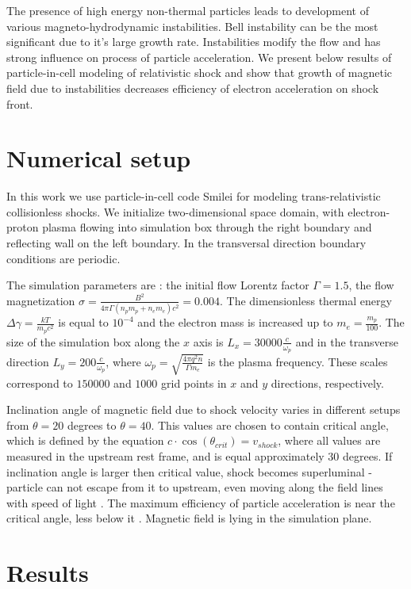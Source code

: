 \documentclass[a4paper]{jpconf}
\begin{document}
	The presence of high energy non-thermal particles leads to development of various magneto-hydrodynamic instabilities. Bell instability \cite{Bell04} can be the most significant due to it's large growth rate. Instabilities modify the flow and has strong influence on process of particle acceleration. We present below results of particle-in-cell modeling of relativistic shock and show that growth of magnetic field due to instabilities decreases efficiency of electron acceleration on shock front.
	
	
	\section{Numerical setup}
	In this work we use particle-in-cell code Smilei \cite{Smilei18} for modeling trans-relativistic collisionless shocks. We initialize two-dimensional space domain, with electron-proton plasma flowing into simulation box through the right boundary and reflecting wall on the left boundary. In the transversal direction boundary conditions are periodic.
	
	The simulation parameters are : the initial flow Lorentz factor $\Gamma = 1.5$, the flow magnetization $\sigma = \frac{B^2}{4\pi\Gamma (n_p m_p + n_e m_e) c^2} = 0.004$. The dimensionless thermal energy $\Delta \gamma = \frac{k T}{m_p c^2}$ is equal to $10^{-4}$ and the electron mass is increased up to $m_e = \frac{m_p}{100}$. The size of the simulation box along the $x$ axis is $L_x = 30000\frac{c}{\omega_p}$ and in the transverse direction $L_y = 200\frac{c}{\omega_p}$, where $\omega_p = \sqrt{\frac{4\pi q^2 n}{\Gamma m_e}}$ is the plasma frequency. These scales correspond to $150000$ and $1000$ grid points in $x$ and $y$ directions, respectively. 
	
	Inclination angle of magnetic field due to shock velocity varies in different setups from $\theta = 20$ degrees to $\theta = 40$. This values are chosen to contain critical angle, which is defined by the equation $c\cdot \cos(\theta_{crit})=v_{shock}$, where all values are measured in the upstream rest frame, and is equal approximately $30$ degrees. If inclination angle is larger then critical value, shock becomes superluminal - particle can not escape from it to upstream, even moving along the field lines with speed of light \cite{Pelletier2017,Sironi2011}. The maximum efficiency of particle acceleration is near the critical angle, less below it \cite{Romansky18}. Magnetic field is lying in the simulation plane.
	
	
	\section{Results}
	
\end{document}
